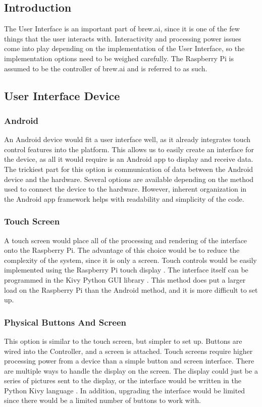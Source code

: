 \documentclass[draftclsnofoot,onecolumn,letterpaper,10pt]{IEEEtran}
\begin{document}
\subsection{Introduction}
The User Interface is an important part of brew.ai, since it is one of the few things that the user interacts with.
Interactivity and processing power issues come into play depending on the implementation of the User Interface, so the implementation options need to be weighed carefully.
The Raspberry Pi is assumed to be the controller of brew.ai and is referred to as such.

\subsection{User Interface Device}

\subsubsection{Android}
An Android device would fit a user interface well, as it already integrates touch control features into the platform.
This allows us to easily create an interface for the device, as all it would require is an Android app to display and receive data.
The trickiest part for this option is communication of data between the Android device and the hardware.
Several options are available depending on the method used to connect the device to the hardware.
However, inherent organization in the Android app framework helps with readability and simplicity of the code.

\subsubsection{Touch Screen}
A touch screen would place all of the processing and rendering of the interface onto the Raspberry Pi.
The advantage of this choice would be to reduce the complexity of the system, since it is only a screen.
Touch controls would be easily implemented using the Raspberry Pi touch display \cite{TouchScreen}.
The interface itself can be programmed in the Kivy Python GUI library \cite{Kivy}.
This method does put a larger load on the Raspberry Pi than the Android method, and it is more difficult to set up.

\subsubsection{Physical Buttons And Screen}
This option is similar to the touch screen, but simpler to set up.
Buttons are wired into the Controller, and a screen is attached.
Touch screens require higher processing power from a device than a simple button and screen interface.
There are multiple ways to handle the display on the screen.
The display could just be a series of pictures sent to the display, or the interface would be written in the Python Kivy language \cite{Kivy}.
In addition, upgrading the interface would be limited since there would be a limited number of buttons to work with.
\end{document}
